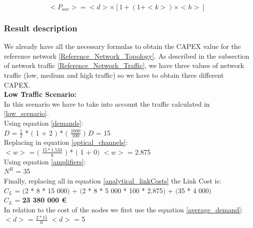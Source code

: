 \begin{equation}
<P_{oxc}> = <d> \times [1 + \left(1 + <k>\right) \times <h>]
\label{Poxc_transp}
\end{equation}
\vspace{11pt}


\subsubsection{Result description}

We already have all the necessary formulas to obtain the CAPEX value for the reference network \ref{Reference_Network_Topology}. As described in the subsection of network traffic \ref{Reference_Network_Traffic}, we have three values of network traffic (low, medium and high traffic) so we have to obtain three different CAPEX.\\
\newpage
\textbf{Low Traffic Scenario:}\\
In this scenario we have to take into account the traffic calculated in \ref{low_scenario}.\\

Using equation \ref{demands}:\\

$D$ = $\frac{1}{2}$ * $($ 1 + 2 $)$ * $($ $\frac{1000}{100}$ $)$ \qquad \qquad $D$ = 15\\

Replacing in equation \ref{optical_channels}:\\

$<w>$ = $($ $\frac{15 * 1.533}{8}$ $)$ * $($ 1 + 0$)$ \qquad \qquad $<w>$ = 2.875\\

Using equation \ref{amplifiers}:\\

$N^R$ = 35\\

Finally, replacing all in equation \ref{analytical_linkCosts} the Link Cost is:\\

$C_L$ = $($2 * 8 * 15 000$)$ + $($2 * 8 * 5 000 * 100 * 2.875$)$ + $($35 * 4 000$)$\\

$C_L$ = \textbf{23 380 000 \euro}\\

In relation to the cost of the nodes we first use the equation \ref{average_demand}:\\

$<d>$ = $\frac{2 * 15}{6}$ \qquad \qquad $<d>$ = 5\\

